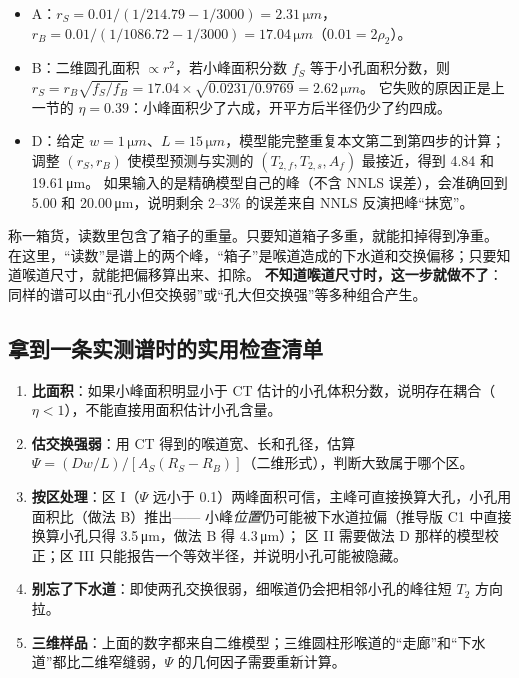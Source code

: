 \documentclass[11pt,a4paper]{article}
\newcommand{\um}{\,\si{\micro m}}
\begin{document}
\begin{numbers}
\begin{itemize}[leftmargin=1.4em,itemsep=1pt]
\item A：$r_S=0.01/(1/214.79-1/3000)=2.31\um$，$r_B=0.01/(1/1086.72-1/3000)=17.04\um$（$0.01=2\rho_2$）。
\item B：二维圆孔面积 $\propto r^2$，若小峰面积分数 $f_S$ 等于小孔面积分数，则 $r_S=r_B\sqrt{f_S/f_B}=17.04\times\sqrt{0.0231/0.9769}=2.62\um$。
它失败的原因正是上一节的 $\eta=0.39$：小峰面积少了六成，开平方后半径仍少了约四成。
\item D：给定 $w=1\um$、$L=15\um$，模型能完整重复本文第二到第四步的计算；调整 $(r_S,r_B)$ 使模型预测与实测的 $(T_{2,f},T_{2,s},A_f)$ 最接近，得到 4.84 和 19.61\um。
如果输入的是精确模型自己的峰（不含 NNLS 误差），会准确回到 5.00 和 20.00\um，说明剩余 2--3\% 的误差来自 NNLS 反演把峰“抹宽”。
\end{itemize}
\end{numbers}

\begin{intuit}[：做法 D 像是“扣皮重”]
称一箱货，读数里包含了箱子的重量。只要知道箱子多重，就能扣掉得到净重。
在这里，“读数”是谱上的两个峰，“箱子”是喉道造成的下水道和交换偏移；只要知道喉道尺寸，就能把偏移算出来、扣除。
\textbf{不知道喉道尺寸时，这一步就做不了}：同样的谱可以由“孔小但交换弱”或“孔大但交换强”等多种组合产生。
\end{intuit}

\subsection{拿到一条实测谱时的实用检查清单}

\begin{enumerate}[leftmargin=1.6em,itemsep=2pt]
\item \textbf{比面积}：如果小峰面积明显小于 CT 估计的小孔体积分数，说明存在耦合（$\eta<1$），不能直接用面积估计小孔含量。
\item \textbf{估交换强弱}：用 CT 得到的喉道宽、长和孔径，估算 $\Psi=(Dw/L)/[A_S(R_S-R_B)]$（二维形式），判断大致属于哪个区。
\item \textbf{按区处理}：区 I（$\Psi$ 远小于 0.1）两峰面积可信，主峰可直接换算大孔，小孔用面积比（做法 B）推出——
小峰\emph{位置}仍可能被下水道拉偏（推导版 C1 中直接换算小孔只得 3.5\um，做法 B 得 4.3\um）；
区 II 需要做法 D 那样的模型校正；区 III 只能报告一个等效半径，并说明小孔可能被隐藏。
\item \textbf{别忘了下水道}：即使两孔交换很弱，细喉道仍会把相邻小孔的峰往短 $T_2$ 方向拉。
\item \textbf{三维样品}：上面的数字都来自二维模型；三维圆柱形喉道的“走廊”和“下水道”都比二维窄缝弱，$\Psi$ 的几何因子需要重新计算。
\end{enumerate}
\end{document}
